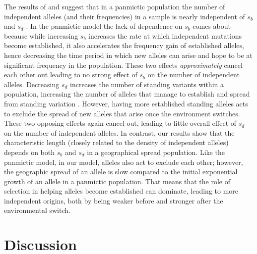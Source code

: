 \documentclass{article}
\newcommand{\mfp}[1]{{\it\color{red} #1} }
\begin{document}
The results of \citet{softsweepsI} and \citet{softsweepsII} suggest that in a
panmictic population the number of independent alleles (and their frequencies) in a sample
is nearly independent of $s_b$ and $s_d$  \citep[although this
breaks down with fluctuating population size,
][]{Wilson-softsweep}. In the panmictic model the
lack of dependence on $s_b$ comes about because while increasing $s_b$
increases the rate at which independent mutations become established,
it also accelerates the frequency gain of established alleles, 
hence decreasing the time period in which new alleles can arise and hope to be at significant frequency in the population. 
These two effects \mfp{approximately} cancel each other out leading to no strong effect of $s_b$ on the number of independent alleles. 
Decreasing $s_d$ increases the number of standing variants within a population, 
increasing the number of alleles that manage to establish and spread from standing variation \citep{softsweepsI,Orr:01}. 
However, having more established standing alleles
acts to exclude the spread of new alleles that arise once the environment switches. 
These two opposing effects again cancel out, leading to little overall
effect of $s_d$ on the number of independent alleles.
In contrast, our results show that the characteristic length 
(closely related to the density of independent alleles) 
depends on both $s_b$ and $s_d$ in a geographical spread population. 
Like the panmictic model, in our model, alleles also act to exclude each other; 
however, the geographic spread of an allele is slow compared to the initial exponential growth of an allele in a panmictic population. 
That means that the role of selection in helping
alleles become established can dominate, leading to more independent origins, both by
being  weaker before and stronger after the environmental switch. 



\section{Discussion}
\end{document}
